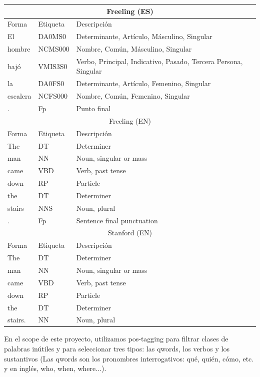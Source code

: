 \begin{center}
\begin{tabular}{| l | l | l |}
\hline
\multicolumn{3}{|c|}{Freeling (ES)} \\ \hline
Forma &  Etiqueta & Descripción \\ \hline 
El & DA0MS0 & Determinante, Artículo, Másculino, Singular\\ \hline 
hombre & NCMS000 & Nombre, Común, Másculino, Singular  \\ \hline 
bajó & VMIS3S0 & Verbo, Principal, Indicativo, Pasado, Tercera Persona, Singular\\ \hline 
la & DA0FS0 & Determinante, Artículo, Femenino, Singular\\ \hline 
escalera& NCFS000 & Nombre, Común, Femenino, Singular \\ \hline 
.& Fp& Punto final\\ \hline \hline
\multicolumn{3}{|c|}{Freeling (EN)} \\ \hline
Forma & Etiqueta & Descripción \\ \hline 
The &DT & Determiner \\ \hline 
man &NN & Noun, singular or mass \\ \hline 
came  &VBD& Verb, past tense\\ \hline 
down  &RP& Particle \\ \hline 
the &DT& Determiner \\ \hline 
stairs & NNS& Noun, plural \\ \hline 
.& Fp& Sentence final punctuation \\ \hline \hline
\multicolumn{3}{|c|}{Stanford (EN)} \\ \hline
Forma & Etiqueta & Descripción \\ \hline 
The &DT & Determiner \\ \hline 
 man & NN & Noun, singular or mass \\ \hline 
  came &VBD  & Verb, past tense \\ \hline 
 down & RP  &  Particle\\ \hline 
 the & DT  &  Determiner \\ \hline 
 stairs. &NN   & Noun, plural \\ \hline 
 \end{tabular}
\end{center}

En el scope de este proyecto, utilizamos pos-tagging para filtrar clases de palabras inútiles y para seleccionar tres tipos: las qwords, los verbos y los sustantivos (Las qwords son los pronombres interrogativos: qué, quién, cómo, etc. y en inglés, who, when, where...). \newline


